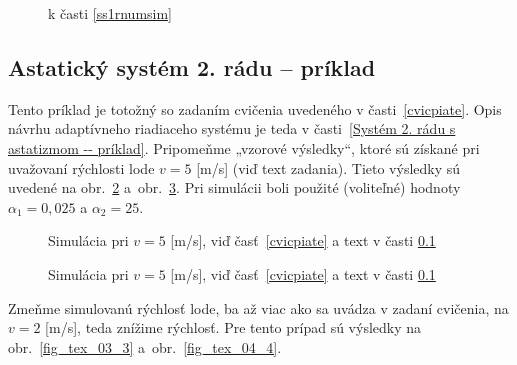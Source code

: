 \documentclass[a4paper, 10pt, ]{article}
\begin{document}
\begin{figure}[t]
	\centering


	\caption{k časti \ref{ss1rnumsim}}
	\label{fig_tex_02_2}

\end{figure}







\subsection{Astatický systém 2. rádu -- príklad}
\label{AS2Rpr}

Tento príklad je totožný so zadaním cvičenia uvedeného v časti~\ref{cvicpiate}. Opis návrhu adaptívneho riadiaceho systému je teda v časti~\ref{Systém 2. rádu s astatizmom -- príklad}. Pripomeňme „vzorové výsledky“, ktoré sú získané pri uvažovaní rýchlosti lode $v = 5$ [m/s] (viď text zadania). Tieto výsledky sú uvedené na obr.~\ref{fig_tex_03_1} a~obr.~\ref{fig_tex_04_2}. Pri simulácii boli použité (voliteľné) hodnoty $\alpha_1 = 0,025$ a $\alpha_2 = 25$.


\begin{figure}[t]
	\centering


	\caption{Simulácia pri $v = 5$ [m/s], viď časť~\ref{cvicpiate} a text v časti \ref{AS2Rpr}}
	\label{fig_tex_03_1}

\end{figure}

\begin{figure}[t]
	\centering


	\caption{Simulácia pri $v = 5$ [m/s], viď časť~\ref{cvicpiate} a text v časti \ref{AS2Rpr}}
	\label{fig_tex_04_2}

\end{figure}










Zmeňme simulovanú rýchlosť lode, ba až viac ako sa uvádza v zadaní cvičenia, na $v = 2$ [m/s], teda znížime rýchlosť. Pre tento prípad sú výsledky na obr.~\ref{fig_tex_03_3} a~obr.~\ref{fig_tex_04_4}.
\end{document}

